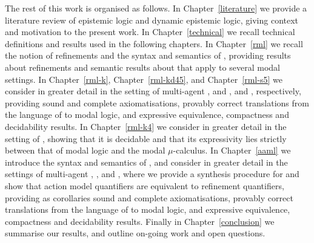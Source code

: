 The rest of this work is organised as follows.
In Chapter~\ref{literature} we provide a literature review of epistemic logic and dynamic epistemic logic, giving context and motivation to the present work.
In Chapter~\ref{technical} we recall technical definitions and results used in the following chapters.
In Chapter~\ref{rml} we recall the notion of refinements and the syntax and semantics of \logicRml{}, providing results about refinements and semantic results about \logicRml{} that apply to several modal settings.
In Chapter~\ref{rml-k}, Chapter~\ref{rml-kd45}, and Chapter~\ref{rml-s5} we consider in greater detail \logicRml{} in the setting of multi-agent \classK{}, \classKFF{} and \classKD{}, and \classS{}, respectively, providing sound and complete axiomatisations, provably correct translations from the language of \logicRml{} to modal logic, and expressive equivalence, compactness and decidability results.
In Chapter~\ref{rml-k4} we consider in greater detail \logicRml{} in the setting of \classKF{}, showing that it is decidable and that its expressivity lies strictly between that of modal logic and the modal $\mu$-calculus.
In Chapter~\ref{aaml} we introduce the syntax and semantics of \logicAaml{}, and consider in greater detail \logicAaml{} in the settings of multi-agent \classK{}, \classKFF{}, and \classS{}, where we provide a synthesis procedure for \logicAaml{} and show that action model quantifiers are equivalent to refinement quantifiers, providing as corollaries sound and complete axiomatisations, provably correct translations from the language of \logicAaml{} to modal logic, and expressive equivalence, compactness and decidability results.
Finally in Chapter~\ref{conclusion} we summarise our results, and outline on-going work and open questions.
